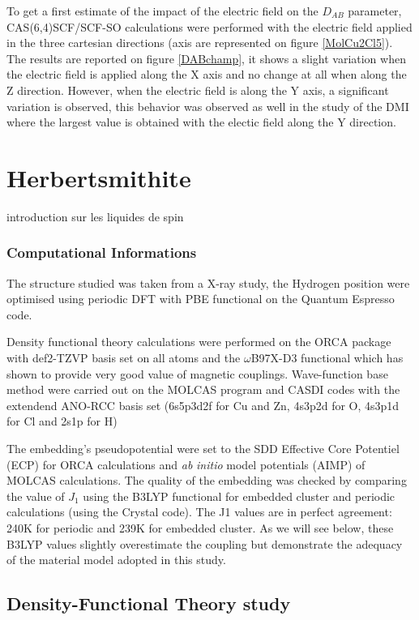 \documentclass[10pt]{report}
\numberwithin{equation}{section}
\begin{document}
To get a first estimate of the impact of the electric field on the $D_{AB}$ parameter, CAS(6,4)SCF/SCF-SO calculations were performed with the electric field applied in the three cartesian directions (axis are represented on figure \ref{MolCu2Cl5}).
The results are reported on figure \ref{DABchamp}, it shows a slight variation when the electric field is applied along the X axis and no change at all when along the Z direction.
However, when the electric field is along the Y axis, a significant variation is observed, this behavior was observed as well in the study of the DMI where the largest value is obtained with the electic field along the Y direction.
 

\chapter{Herbertsmithite}

introduction sur les liquides de spin

\subsection*{Computational Informations}

The structure studied was taken from a X-ray study, the Hydrogen position were optimised using periodic DFT with PBE functional on the Quantum Espresso code.

Density functional theory calculations were performed on the ORCA package with def2-TZVP basis set on all atoms and the $\omega$B97X-D3 functional which has shown to provide very good value of magnetic couplings.
Wave-function base method were carried out on the MOLCAS program and CASDI codes with the extendend ANO-RCC basis set (6s5p3d2f for Cu and Zn, 4s3p2d
for O, 4s3p1d for Cl and 2s1p for H)

The embedding's pseudopotential were set to the SDD Effective Core Potentiel (ECP) for ORCA calculations and \textit{ab} \textit{initio} model potentials (AIMP) of MOLCAS calculations. 
The quality of the embedding was checked by comparing the value of $J_1$ using the B3LYP functional for embedded cluster and periodic calculations (using the Crystal code). 
The J1 values are in perfect agreement: 240K for periodic and 239K for embedded cluster. 
As we will see below, these B3LYP values slightly overestimate the coupling but demonstrate the adequacy of the material model adopted in this study.

\section{Density-Functional Theory study}
\end{document}
